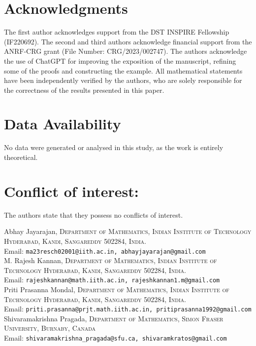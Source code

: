 \documentclass[12pt]{article}
\theoremstyle{plain}
\numberwithin{equation}{section}
\newcommand{\affl}[3]{%
	\noindent #1,
	\textsc{#3}\\
	Email: \texttt{#2}\\[1.5pt]
}
\begin{document}
	
	
	
	
	\section*{Acknowledgments}
	The first author acknowledges support from the DST INSPIRE Fellowship (IF220692). The second and third authors acknowledge financial support from the ANRF-CRG grant (File Number: CRG/2023/002747). The authors acknowledge the use of ChatGPT for improving the exposition of the manuscript, refining some of the proofs and constructing the example. All mathematical statements have been independently verified by the authors, who are solely responsible for the correctness of the results presented in this paper.
	
	\section*{Data Availability} No data were generated or analysed in this study, as the work is entirely theoretical. 
	
	\section*{Conflict of interest:} 
	The authors state that they possess no conflicts of interest.
	
	
	
	\vspace{0.4cm}
	\affl{Abhay Jayarajan}{ma23resch02001@iith.ac.in, abhayjayarajan@gmail.com}{ Department of Mathematics, Indian Institute of Technology Hyderabad, Kandi, Sangareddy 502284, India.}
	
	\affl{M. Rajesh Kannan}{rajeshkannan@math.iith.ac.in, rajeshkannan1.m@gmail.com}{Department of Mathematics, Indian Institute of Technology Hyderabad, Kandi, Sangareddy 502284, India.}
	
	\affl{Priti Prasanna Mondal}{priti.prasanna@prjt.math.iith.ac.in, pritiprasanna1992@gmail.com}{Department of Mathematics, Indian Institute of Technology Hyderabad, Kandi, Sangareddy 502284, India.}
	
	\affl{Shivaramakrishna Pragada}{shivaramakrishna\_pragada@sfu.ca, shivaramkratos@gmail.com}{Department of Mathematics, Simon Fraser University, Burnaby, Canada}
\end{document}
